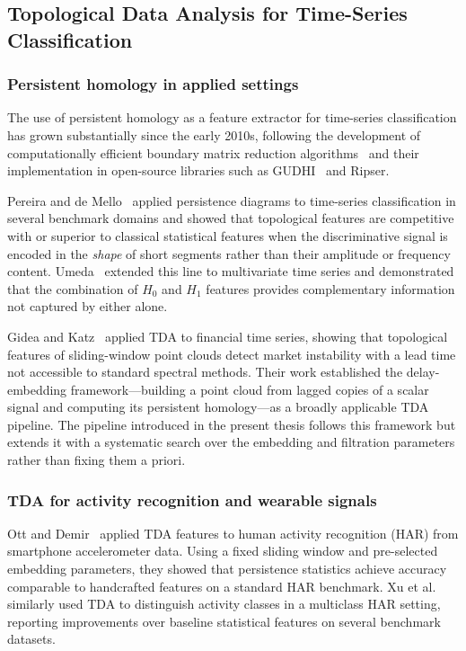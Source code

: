 \documentclass[onluarkali,ingilizce,yukseklisans,karton,LisansustuEgitim]{itutez}
\providecommand{\1}{\mathbf{1}}
\begin{document}
\subsection{Topological Data Analysis for Time-Series Classification}
\label{subsec:rw-tda}

\subsubsection{Persistent homology in applied settings}

The use of persistent homology as a feature extractor for time-series classification
has grown substantially since the early 2010s, following the development of
computationally efficient boundary matrix reduction
algorithms~\parencite{edelsbrunner2002topological} and their implementation in
open-source libraries such as GUDHI~\parencite{gudhi} and Ripser.

Pereira and de Mello~\parencite{pereira2015persistent} applied persistence diagrams to
time-series classification in several benchmark domains and showed that topological
features are competitive with or superior to classical statistical features when the
discriminative signal is encoded in the \emph{shape} of short segments rather than
their amplitude or frequency content.  Umeda~\parencite{umeda2017time} extended this line
to multivariate time series and demonstrated that the combination of $H_0$ and $H_1$
features provides complementary information not captured by either alone.

Gidea and Katz~\parencite{gidea2018topological} applied TDA to financial time series,
showing that topological features of sliding-window point clouds detect market
instability with a lead time not accessible to standard spectral methods.  Their
work established the delay-embedding framework---building a point cloud from lagged
copies of a scalar signal and computing its persistent homology---as a broadly
applicable TDA pipeline.  The pipeline introduced in the present thesis follows
this framework but extends it with a systematic search over the embedding and
filtration parameters rather than fixing them a priori.

\subsubsection{TDA for activity recognition and wearable signals}

Ott and Demir~\parencite{ott2017topological} applied TDA features to human activity
recognition (HAR) from smartphone accelerometer data.  Using a fixed sliding window
and pre-selected embedding parameters, they showed that persistence statistics
achieve accuracy comparable to handcrafted features on a standard HAR benchmark.
Xu et al.~\parencite{xu2019topological} similarly used TDA to distinguish activity classes
in a multiclass HAR setting, reporting improvements over baseline statistical
features on several benchmark datasets.
\end{document}
